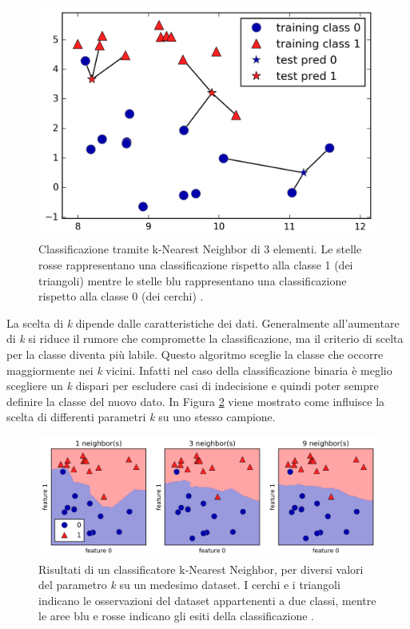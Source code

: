 \documentclass[a4paper,12pt]{report}
\begin{document}
\begin{figure}[ht]
    \centering
    \includegraphics[scale = 0.2]{images/knearest_3_vicini.png}
    \caption{Classificazione tramite k-Nearest Neighbor di 3 elementi. Le stelle rosse rappresentano una classificazione rispetto alla classe 1 (dei triangoli) mentre le stelle blu rappresentano una classificazione rispetto alla classe 0 (dei cerchi) \cite{figure_copyright}.}
    \label{fig:knearest_3_vicini}
\end{figure}

La scelta di \textit{k} dipende dalle caratteristiche dei dati. Generalmente all'aumentare di \textit{k} si riduce il rumore che compromette la classificazione, ma il criterio di scelta per la classe diventa più labile.
Questo algoritmo sceglie la classe che occorre maggiormente nei \textit{k} vicini. Infatti nel caso della classificazione binaria è meglio scegliere un \textit{k} dispari per escludere casi di indecisione e quindi poter sempre definire la classe del nuovo dato. In Figura \ref{fig:differenza_vicini} viene mostrato come influisce la scelta di differenti parametri \textit{k} su uno stesso campione.

\begin{figure}[ht]
    \centering
    \includegraphics[scale = 0.2]{images/knearest_differenza_vicini.png}
    \caption{Risultati di un classificatore k-Nearest Neighbor, per diversi valori del parametro \textit{k} su un medesimo dataset. I cerchi e i triangoli indicano le osservazioni del dataset appartenenti a due classi, mentre le aree blu e rosse indicano gli esiti della classificazione \cite{figure_copyright}.}
    \label{fig:differenza_vicini}
\end{figure}
\end{document}
